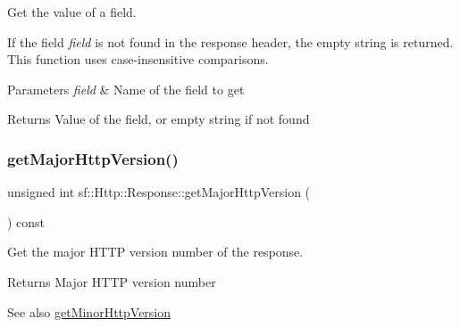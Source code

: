 Get the value of a field. 

If the field {\itshape field} is not found in the response header, the empty string is returned. This function uses case-\/insensitive comparisons.


\begin{DoxyParams}{Parameters}
{\em field} & Name of the field to get\\
\hline
\end{DoxyParams}
\begin{DoxyReturn}{Returns}
Value of the field, or empty string if not found \begin{DoxyVerb}\end{DoxyVerb}
 
\end{DoxyReturn}
\mbox{\label{classsf_1_1_http_1_1_response_ab1c6948f6444fad34d0537e206e398b8}} 
\subsubsection{\texorpdfstring{getMajorHttpVersion()}{getMajorHttpVersion()}}
{\footnotesize\ttfamily unsigned int sf\+::\+Http\+::\+Response\+::get\+Major\+Http\+Version (\begin{DoxyParamCaption}{ }\end{DoxyParamCaption}) const}



Get the major H\+T\+TP version number of the response. 

\begin{DoxyReturn}{Returns}
Major H\+T\+TP version number
\end{DoxyReturn}
\begin{DoxySeeAlso}{See also}
\mbox{\hyperlink{classsf_1_1_http_1_1_response_af3c649568d2e291e71c3a7da546bb392}{get\+Minor\+Http\+Version}} \begin{DoxyVerb}\end{DoxyVerb}
 
\end{DoxySeeAlso}
\mbox{\label{classsf_1_1_http_1_1_response_af3c649568d2e291e71c3a7da546bb392}} 
